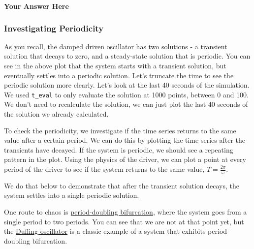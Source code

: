 \documentclass[11pt]{article}
\begin{document}
\textbf{Your Answer Here}

    \subsubsection{Investigating
Periodicity}\label{investigating-periodicity}

As you recall, the damped driven oscillator has two solutions - a
transient solution that decays to zero, and a steady-state solution that
is periodic. You can see in the above plot that the system starts with a
transient solution, but eventually settles into a periodic solution.
Let's truncate the time to see the periodic solution more clearly. Let's
look at the last 40 seconds of the simulation. We used \texttt{t\_eval}
to only evaluate the solution at 1000 points, between 0 and 100. We
don't need to recalculate the solution, we can just plot the last 40
seconds of the solution we already calculated.

To check the periodicity, we investigate if the time series returns to
the same value after a certain period. We can do this by plotting the
time series after the transients have decayed. If the system is
periodic, we should see a repeating pattern in the plot. Using the
physics of the driver, we can plot a point at every period of the driver
to see if the system returns to the same value,
\(T = \frac{2\pi}{\omega}\).

We do that below to demonstrate that after the transient solution
decays, the system settles into a single periodic solution.

One route to chaos is
\href{https://en.wikipedia.org/wiki/Period-doubling_bifurcation}{period-doubling
bifurcation}, where the system goes from a single period to two periods.
You can see that we are not at that point yet, but the
\href{https://en.wikipedia.org/wiki/Duffing_equation}{Duffing
oscillator} is a classic example of a system that exhibits
period-doubling bifurcation.
\end{document}
